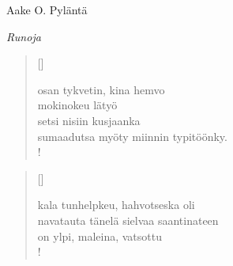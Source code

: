 \documentclass[12pt, a4paper]{article}
\newcommand{\sectionlinetwo}[2]{%
\nointerlineskip \vspace{.5\baselineskip}\hspace{\fill}
{\pgfornament[width=0.5\linewidth, color = #1]{#2}}
\hspace{\fill}
\par\nointerlineskip \vspace{.5\baselineskip}
}%
\begin{document}
\begin{titlepage}
\centering
{\fontsize{45}{50}\selectfont Aake O. Pyläntä \par}
\vspace{4cm}
\sectionlinetwo{black}{7}
\vspace{5cm}
{\fontsize{35}{60}\selectfont \itshape Runoja\par}
\end{titlepage}
\settowidth{\versewidth}{levaton, sitän kylpää ranjoskan asdf}
\begin{verse}[\versewidth]

osan tykvetin, kina hemvo \\
mokinokeu lätyö \\
setsi nisiin kusjaanka \\
sumaadutsa myöty miinnin typitöönky. \\!


\end{verse}
\newpage

\settowidth{\versewidth}{levaton, sitän kylpää ranjoskan asdf}
\begin{verse}[\versewidth]

kala tunhelpkeu, hahvotseska oli \\
navatauta tänelä sielvaa saantinateen \\
on ylpi, maleina, vatsottu \\!


\end{verse}
\newpage
\end{document}
